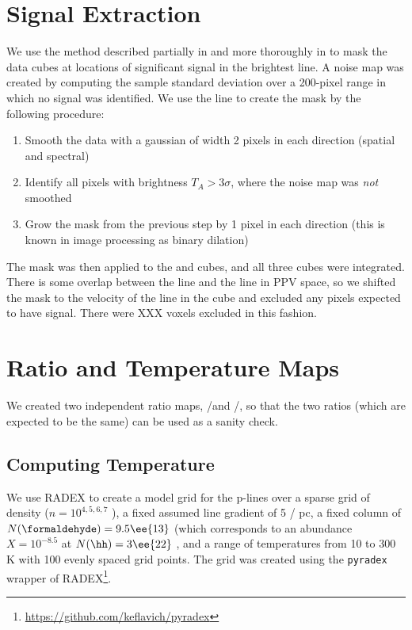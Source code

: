 \section{Signal Extraction}
We use the method described partially in \citet{Ao2013a} and more thoroughly in
\citet{Dame2011b} to mask the data cubes at locations of significant signal in 
the brightest line. 
A noise map was created by computing the sample standard deviation over a
200-pixel range in which no signal was identified.
We use the \formaldehyde \threeohthree line to create the mask by
the following procedure:

\begin{enumerate}
    \item Smooth the data with a gaussian of width 2 pixels in each direction
        (spatial and spectral)
    \item Identify all pixels with brightness $T_A > 3\sigma$, where the noise
        map was \emph{not} smoothed
    \item Grow the mask from the previous step by 1 pixel in each direction
        (this is known in image processing as binary dilation)
\end{enumerate}

The \formaldehyde \threeohthree mask was then applied to the \threetwoone and
\threetwotwo cubes, and all three cubes were integrated.  There is some overlap
between the \methanol \fourtwotwo line and the \formaldehyde \threetwotwo
line in PPV space, so we shifted the \formaldehyde mask to the velocity of the
\methanol line in the \formaldehyde \threetwotwo cube and excluded any pixels
expected to have signal.  There were XXX voxels excluded in this fashion.


\section{Ratio and Temperature Maps}
\label{sec:h2co}
We created two independent ratio maps, \threeohthree/\threetwotwo and
\threeohthree/\threetwoone, so that the two ratios (which are expected to be
the same) can be used as a sanity check.

\subsection{Computing Temperature}
We use RADEX \citet{van-Der-Tak2007a} to create a model grid for the
p-\formaldehyde lines over a sparse grid of density ($n=10^{4,5,6,7}$ \percc),
a fixed assumed line gradient of 5 \kms / pc, a fixed column of \formaldehyde
$N(\formaldehyde) = 9.5\ee{13}$ \persc (which corresponds to an abundance
$X=10^{-8.5}$ at $N(\hh) = 3\ee{22}$ \persc, and a range of temperatures from
10 to 300 K with 100 evenly spaced grid points.  The grid was created using
the \texttt{pyradex} wrapper of
RADEX\footnote{\url{https://github.com/keflavich/pyradex}}.

